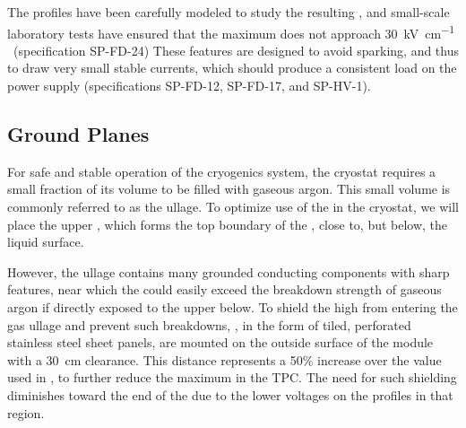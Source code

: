 The profiles have been carefully modeled to study the resulting \efield{}, 
and small-scale laboratory tests have %
ensured that the maximum \efield{} does not approach \SI{30}{\kV\per\cm}
~\cite{Blatter:2014wua}(specification SP-FD-24)
These features are designed to avoid sparking, and thus to draw very small stable currents, 
which should produce a consistent load on the power supply (specifications SP-FD-12, SP-FD-17, and SP-HV-1).




\subsection{Ground Planes}
\label{sec:fdsp-hv-des-fc-gp}

For safe and stable operation of the \lar cryogenics system, the cryostat requires a small fraction of its volume to be filled with gaseous argon. This small volume is commonly referred to as the ullage. To optimize use of the \lar in the cryostat, we will place the upper , which forms the top boundary of the , close to, but below, the liquid surface.

However, the ullage contains many grounded %
conducting components with sharp features, near which the \efield could easily exceed the breakdown strength of gaseous argon if directly exposed to the upper  below. To shield the high \efield from entering the gas ullage and prevent such breakdowns, %
, %
in the form of tiled, perforated stainless steel sheet panels, are mounted on the outside surface of the 
 module with a \SI{30}{\cm} clearance.  This distance represents a 50\% increase over the value used in , to further reduce the maximum \efield in the TPC. 
The need for such shielding diminishes toward the  end of the  due to the lower voltages on the  profiles in that region. %

